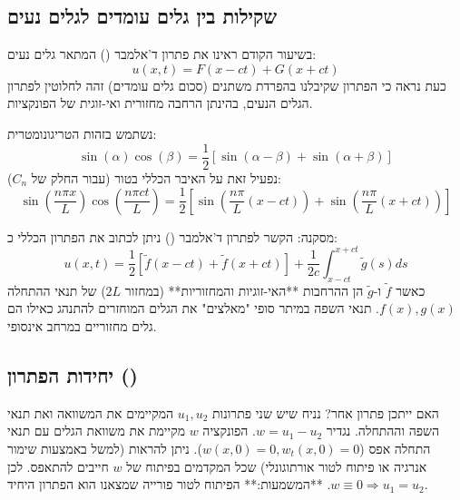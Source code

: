 \begin{center}
\end{center}

\subsection{שקילות בין גלים עומדים לגלים נעים}
בשיעור הקודם ראינו את פתרון ד'אלמבר () המתאר גלים נעים:
$$u(x,t) = F(x-ct) + G(x+ct)$$
כעת נראה כי הפתרון שקיבלנו בהפרדת משתנים (סכום גלים עומדים) זהה לחלוטין לפתרון הגלים הנעים, בהינתן הרחבה מחזורית ואי-זוגית של הפונקציות.

נשתמש בזהות הטריגונומטרית:
$$\sin(\alpha)\cos(\beta) = \frac{1}{2}[\sin(\alpha-\beta) + \sin(\alpha+\beta)]$$
נפעיל זאת על האיבר הכללי בטור (עבור החלק של $C_n$):
$$\sin\left(\frac{n\pi x}{L}\right) \cos\left(\frac{n\pi c t}{L}\right) = \frac{1}{2} \left[ \sin\left(\frac{n\pi}{L}(x-ct)\right) + \sin\left(\frac{n\pi}{L}(x+ct)\right) \right]$$

\begin{theorembox}{מסקנה: הקשר לפתרון ד'אלמבר ()}
ניתן לכתוב את הפתרון הכללי כ:
$$u(x,t) = \frac{1}{2} \left[ \tilde{f}(x-ct) + \tilde{f}(x+ct) \right] + \frac{1}{2c} \int_{x-ct}^{x+ct} \tilde{g}(s) ds$$
כאשר $\tilde{f}$ ו-$\tilde{g}$ הן ההרחבות **האי-זוגיות והמחזוריות** (במחזור $2L$) של תנאי ההתחלה $f(x), g(x)$.
תנאי השפה במיתר סופי "מאלצים" את הגלים המוחזרים להתנהג כאילו הם גלים מחזוריים במרחב אינסופי.
\end{theorembox}

\subsection{יחידות הפתרון ()}
האם ייתכן פתרון אחר?
נניח שיש שני פתרונות $u_1, u_2$ המקיימים את המשוואה ואת תנאי השפה וההתחלה.
נגדיר $w = u_1 - u_2$. הפונקציה $w$ מקיימת את משוואת הגלים עם תנאי התחלה אפס ($w(x,0)=0, w_t(x,0)=0$).
ניתן להראות (למשל באמצעות שימור אנרגיה או פיתוח לטור אורתוגונלי) שכל המקדמים בפיתוח של $w$ חייבים להתאפס.
לכן $w \equiv 0 \Rightarrow u_1 = u_2$.
**המשמעות:** הפיתוח לטור פורייה שמצאנו הוא הפתרון היחיד.

